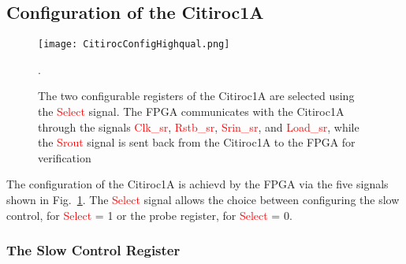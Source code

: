 \subsection{Configuration of the Citiroc1A}\label{sec:configuration}
\begin{figure}[h]
    \centering
    \texttt{[image: CitirocConfigHighqual.png]}
    \caption{The two configurable registers of the Citiroc1A are selected using the \textcolor{red}{Select} signal. 
    The FPGA communicates with the Citiroc1A through the signals \textcolor{red}{Clk\_sr}, \textcolor{red}{Rstb\_sr}, 
    \textcolor{red}{Srin\_sr}, and \textcolor{red}{Load\_sr}, while the \textcolor{red}{Srout} signal is sent back from the Citiroc1A to the FPGA for verification\autocite{datasheetCITIROC}}.
    \label{fig:CITIROC1A_config}
\end{figure}
The configuration of the Citiroc1A is achievd by the FPGA via the five signals shown in Fig.~\ref{fig:CITIROC1A_config}.
The \textcolor{red}{Select} signal allows the choice between configuring the slow control, for \textcolor{red}{Select} = 1  or the probe register, for \textcolor{red}{Select} = 0\autocite{datasheetCITIROC}.

\subsubsection{The Slow Control Register}

